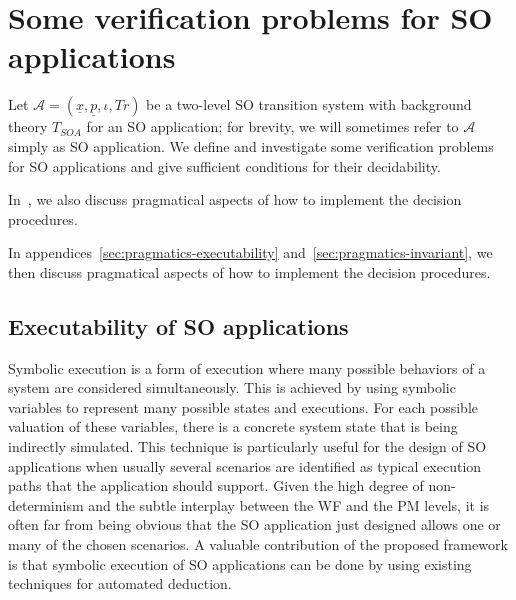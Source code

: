 \documentclass[conference]{IEEEtran}
\begin{document}
\section{Some verification problems for SO applications}
\label{sec:verification}
Let $\mathcal{A}=(\underline{x},\underline{p},\iota,Tr)$ be a
two-level SO transition system with background theory $T_\mathit{SOA}$
for an SO application; for brevity, we will sometimes refer to
$\mathcal{A}$ simply as SO application. We define and investigate some
verification problems for SO applications and give sufficient
conditions for their decidability.
\begin{SHORT}
In~\cite{BRV-TR09}, we also
discuss pragmatical aspects of how to implement the decision procedures.
\end{SHORT}
\begin{LONG}
In appendices~\ref{sec:pragmatics-executability} and~\ref{sec:pragmatics-invariant}, we then 
discuss pragmatical aspects of how to implement the decision procedures.
\end{LONG}

\subsection{Executability of SO applications}
\label{sec:exec-so-apps}

Symbolic execution is a form of execution where many possible
behaviors of a system are considered simultaneously. This is achieved
by using symbolic variables to represent many possible states and
executions. For each possible valuation of these variables, there is a
concrete system state that is being indirectly simulated.  This
technique is particularly useful for the design of SO applications when
usually several scenarios are identified as typical execution paths
that the application should support.  Given the high degree of
non-determinism and the subtle interplay between the WF and
the PM levels, it is often far from being obvious that the SO
application just designed allows one or many of the chosen scenarios.  A
valuable contribution of the proposed framework is that symbolic
execution of SO applications can be done by using existing techniques
for automated deduction.  
\end{document}
